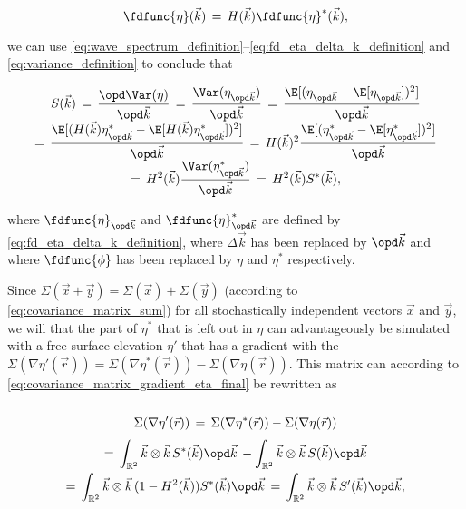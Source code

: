 \begin{equation}
\fdfunc{\eta}(\vec{k}) \,=\, H(\vec{k})\fdfunc{\eta}^*(\vec{k}),
\end{equation}

we can use  \ref{eq:wave_spectrum_definition}--\ref{eq:fd_eta_delta_k_definition} and \eqref{eq:variance_definition} to conclude that

\begin{equation} \label{spectrum_reduced_definition}
\renewcommand*{\arraystretch}{2}
\begin{array}{c}
\displaystyle S(\vec{k}) \,=\, \frac{\opd \Var(\eta)}{\opd\vec{k}} \,=\, \frac{\Var(\eta_{\opd\vec{k}})}{\opd\vec{k}} \,=\, \frac{\E[(\eta_{\opd\vec{k}}-\E[\eta_{\opd\vec{k}}])^2]}{\opd\vec{k}} \\
\displaystyle =\, \frac{\E[(H(\vec{k})\eta^*_{\opd\vec{k}}-\E[H(\vec{k})\eta^*_{\opd\vec{k}}])^2]}{\opd\vec{k}} \,=\, H(\vec{k})^2\frac{\E[(\eta^*_{\opd\vec{k}}-\E[\eta^*_{\opd\vec{k}}])^2]}{\opd\vec{k}} \\
\displaystyle =\, H^2(\vec{k})\frac{\Var(\eta^*_{\opd\vec{k}})}{\opd\vec{k}} \,=\, H^2(\vec{k})S^*(\vec{k}),
\end{array}
\end{equation}

where $\fdfunc{\eta}_{\opd\vec{k}}$ and $\fdfunc{\eta}^*_{\opd\vec{k}}$ are defined by \eqref{eq:fd_eta_delta_k_definition}, where $\Delta\vec{k}$ has been replaced by $\opd\vec{k}$ and where $\fdfunc{\phi}$ has been replaced by $\eta$ and $\eta^*$ respectively.

Since $\Sigma(\vec{x}+\vec{y}) = \Sigma(\vec{x})+\Sigma(\vec{y})$ (according to \eqref{eq:covariance_matrix_sum}) for all stochastically independent vectors $\vec{x}$ and $\vec{y}$, we will \assume that the part of $\eta^*$ that is left out in $\eta$ can advantageously be simulated with a free surface elevation $\eta'$ that has a gradient with the  $\Sigma(\nabla\eta'(\vec{r})) = \Sigma(\nabla\eta^*(\vec{r})) - \Sigma(\nabla\eta(\vec{r}))$. This matrix can according to  \eqref{eq:covariance_matrix_gradient_eta_final} be rewritten as

\begin{equation}
\renewcommand*{\arraystretch}{2}
\begin{array}{c}
\displaystyle \Sigma(\nabla\eta'(\vec{r})) \,=\, \Sigma(\nabla\eta^*(\vec{r})) - \Sigma(\nabla\eta(\vec{r})) \\
\displaystyle =\, \int_{\mathbb{R}^2}\vec{k}\otimes\vec{k}\,S^*(\vec{k})\opd\vec{k} \,- \int_{\mathbb{R}^2}\vec{k}\otimes\vec{k}\,S(\vec{k})\opd\vec{k} \\
\displaystyle =\, \int_{\mathbb{R}^2}\vec{k}\otimes\vec{k}\,(1-H^2(\vec{k}))S^*(\vec{k})\opd\vec{k} \,=\, \int_{\mathbb{R}^2}\vec{k}\otimes\vec{k}\,S'(\vec{k})\opd\vec{k},
\end{array}
\end{equation}

